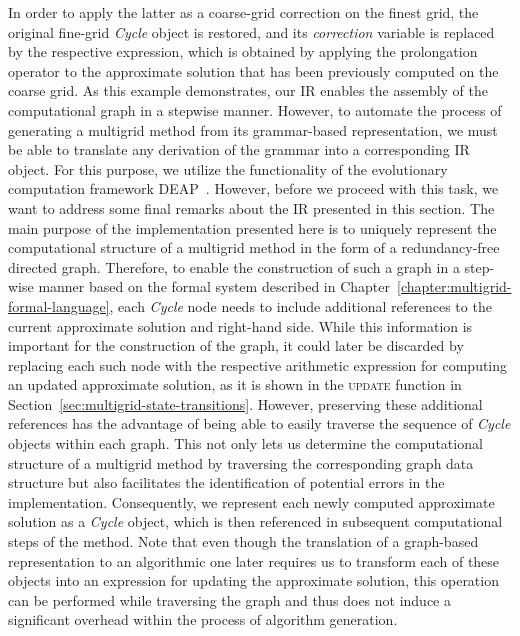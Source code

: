 In order to apply the latter as a coarse-grid correction on the finest grid, the original fine-grid \emph{Cycle} object is restored, and its \emph{correction} variable is replaced by the respective expression, which is obtained by applying the prolongation operator to the approximate solution that has been previously computed on the coarse grid.
As this example demonstrates, our IR enables the assembly of the computational graph in a stepwise manner.
However, to automate the process of generating a multigrid method from its grammar-based representation, we must be able to translate any derivation of the grammar into a corresponding IR object.
For this purpose, we utilize the functionality of the evolutionary computation framework DEAP~\cite{rainville2012deap}.
However, before we proceed with this task, we want to address some final remarks about the IR presented in this section.
The main purpose of the implementation presented here is to uniquely represent the computational structure of a multigrid method in the form of a redundancy-free directed graph.
Therefore, to enable the construction of such a graph in a step-wise manner based on the formal system described in Chapter~\ref{chapter:multigrid-formal-language}, each \emph{Cycle} node needs to include additional references to the current approximate solution and right-hand side.
While this information is important for the construction of the graph, it could later be discarded by replacing each such node with the respective arithmetic expression for computing an updated approximate solution, as it is shown in the \textsc{update} function in Section~\ref{sec:multigrid-state-transitions}.
However, preserving these additional references has the advantage of being able to easily traverse the sequence of \emph{Cycle} objects within each graph.
This not only lets us determine the computational structure of a multigrid method by traversing the corresponding graph data structure but also facilitates the identification of potential errors in the implementation.
Consequently, we represent each newly computed approximate solution as a \emph{Cycle} object, which is then referenced in subsequent computational steps of the method.
Note that even though the translation of a graph-based representation to an algorithmic one later requires us to transform each of these objects into an expression for updating the approximate solution, this operation can be performed while traversing the graph and thus does not induce a significant overhead within the process of algorithm generation.

